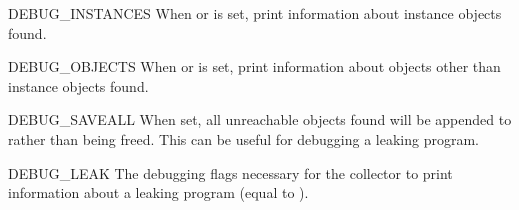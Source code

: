 \begin{datadesc}{DEBUG_INSTANCES}
When  or  is
set, print information about instance objects found.
\end{datadesc}

\begin{datadesc}{DEBUG_OBJECTS}
When  or  is
set, print information about objects other than instance objects found.
\end{datadesc}

\begin{datadesc}{DEBUG_SAVEALL}
When set, all unreachable objects found will be appended to
 rather than being freed.  This can be useful for debugging
a leaking program.
\end{datadesc}

\begin{datadesc}{DEBUG_LEAK}
The debugging flags necessary for the collector to print
information about a leaking program (equal to ).
\end{datadesc}
